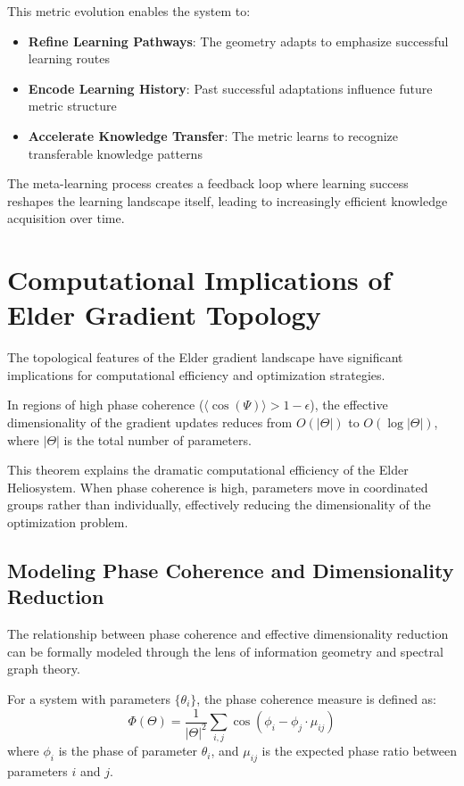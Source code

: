 This metric evolution enables the system to:
\begin{itemize}
    \item \textbf{Refine Learning Pathways}: The geometry adapts to emphasize successful learning routes
    \item \textbf{Encode Learning History}: Past successful adaptations influence future metric structure
    \item \textbf{Accelerate Knowledge Transfer}: The metric learns to recognize transferable knowledge patterns
\end{itemize}

The meta-learning process creates a feedback loop where learning success reshapes the learning landscape itself, leading to increasingly efficient knowledge acquisition over time.

\section{Computational Implications of Elder Gradient Topology}

The topological features of the Elder gradient landscape have significant implications for computational efficiency and optimization strategies.

\begin{theorem}
In regions of high phase coherence ($\langle\cos(\Psi)\rangle > 1-\epsilon$), the effective dimensionality of the gradient updates reduces from $O(|\Theta|)$ to $O(\log|\Theta|)$, where $|\Theta|$ is the total number of parameters.
\end{theorem}

This theorem explains the dramatic computational efficiency of the Elder Heliosystem. When phase coherence is high, parameters move in coordinated groups rather than individually, effectively reducing the dimensionality of the optimization problem.

\subsection{Modeling Phase Coherence and Dimensionality Reduction}

The relationship between phase coherence and effective dimensionality reduction can be formally modeled through the lens of information geometry and spectral graph theory.

\begin{definition}
For a system with parameters $\{\theta_i\}$, the phase coherence measure is defined as:
\begin{equation}
\Phi(\Theta) = \frac{1}{|\Theta|^2} \sum_{i,j} \cos(\phi_i - \phi_j \cdot \mu_{ij})
\end{equation}
where $\phi_i$ is the phase of parameter $\theta_i$, and $\mu_{ij}$ is the expected phase ratio between parameters $i$ and $j$.
\end{definition}

